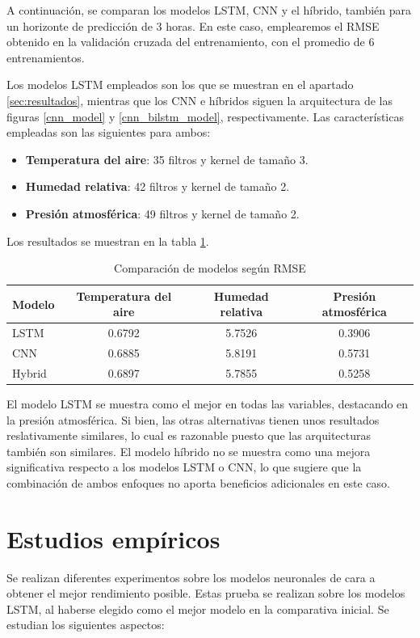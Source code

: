 A continuación, se comparan los modelos LSTM, CNN y el híbrido, también para un horizonte de predicción de 3 horas. En este caso,
emplearemos el RMSE obtenido en la validación cruzada del entrenamiento, con el promedio de 6 entrenamientos.

Los modelos LSTM empleados son los que se muestran en el apartado \ref{sec:resultados}, mientras que los CNN e híbridos siguen la arquitectura de las figuras
\ref{cnn_model} y \ref{cnn_bilstm_model}, respectivamente. Las características empleadas son las siguientes para ambos:
\begin{itemize}
    \item \textbf{Temperatura del aire}: 35 filtros y kernel de tamaño 3.
    \item \textbf{Humedad relativa}: 42 filtros y kernel de tamaño 2.
    \item \textbf{Presión atmosférica}: 49 filtros y kernel de tamaño 2.
\end{itemize}


Los resultados se muestran en la tabla \ref{comparativa_inicial_neuronal}.
\begin{table}[h!]
\centering
\begin{tabular}{|l|c|c|c|}
\hline
\textbf{Modelo} & \textbf{Temperatura del aire} & \textbf{Humedad relativa} & \textbf{Presión atmosférica} \\
\hline
LSTM   &     0.6792          &      5.7526          &       0.3906            \\
\hline
CNN    &      0.6885         &     5.8191         &       0.5731         \\
\hline
Hybrid &       0.6897        &      5.7855           &   0.5258                  \\
\hline
\end{tabular}
\caption{Comparación de modelos según RMSE}
\label{comparativa_inicial_neuronal}
\end{table}  

El modelo LSTM se muestra como el mejor en todas las variables, destacando en la presión atmosférica. Si bien, las otras alternativas tienen unos resultados reslativamente similares,
lo cual es razonable puesto que las arquitecturas también son similares.
El modelo híbrido no se muestra como una mejora significativa respecto a los modelos LSTM o CNN, lo que sugiere que la combinación de ambos enfoques no aporta beneficios adicionales en este caso.

\section{Estudios empíricos}
Se realizan diferentes experimentos sobre los modelos neuronales de cara a obtener el mejor rendimiento posible. Estas prueba se realizan sobre los modelos LSTM, al haberse
elegido como el mejor modelo en la comparativa inicial. Se estudian los siguientes aspectos:

